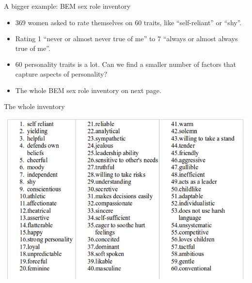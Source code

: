 \documentclass[ignorenonframetext,]{beamer}
\begin{document}
\begin{frame}{A bigger example: BEM sex role inventory}
\protect\hypertarget{a-bigger-example-bem-sex-role-inventory}{}

\begin{itemize}
\item
  369 women asked to rate themselves on 60 traits, like ``self-reliant''
  or ``shy''.
\item
  Rating 1 ``never or almost never true of me'' to 7 ``always or almost
  always true of me''.
\item
  60 personality traits is a lot. Can we find a smaller number of
  factors that capture aspects of personality?
\item
  The whole BEM sex role inventory on next page.
\end{itemize}

\end{frame}

\begin{frame}{The whole inventory}
\protect\hypertarget{the-whole-inventory}{}

\includegraphics{bem.png}

\end{frame}
\end{document}
